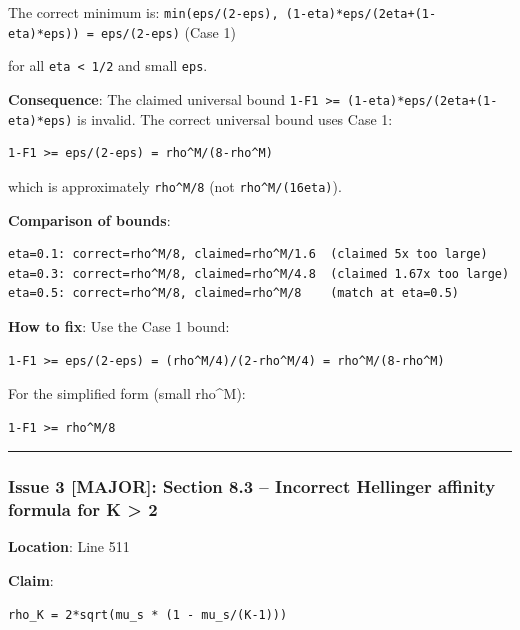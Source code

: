 \documentclass[
  12pt,
]{ctexart}
\begin{document}
The correct minimum is:
\texttt{min(eps/(2-eps),\ (1-eta)*eps/(2eta+(1-eta)*eps))\ =\ eps/(2-eps)}
(Case 1)

for all \texttt{eta\ \textless{}\ 1/2} and small \texttt{eps}.

\textbf{Consequence}: The claimed universal bound
\texttt{1-F1\ \textgreater{}=\ (1-eta)*eps/(2eta+(1-eta)*eps)} is
invalid. The correct universal bound uses Case 1:

\begin{verbatim}
1-F1 >= eps/(2-eps) = rho^M/(8-rho^M)
\end{verbatim}

which is approximately \texttt{rho\^{}M/8} (not
\texttt{rho\^{}M/(16eta)}).

\textbf{Comparison of bounds}:

\begin{verbatim}
eta=0.1: correct=rho^M/8, claimed=rho^M/1.6  (claimed 5x too large)
eta=0.3: correct=rho^M/8, claimed=rho^M/4.8  (claimed 1.67x too large)
eta=0.5: correct=rho^M/8, claimed=rho^M/8    (match at eta=0.5)
\end{verbatim}

\textbf{How to fix}: Use the Case 1 bound:

\begin{verbatim}
1-F1 >= eps/(2-eps) = (rho^M/4)/(2-rho^M/4) = rho^M/(8-rho^M)
\end{verbatim}

For the simplified form (small rho\^{}M):

\begin{verbatim}
1-F1 >= rho^M/8
\end{verbatim}

\begin{center}\rule{0.5\linewidth}{0.5pt}\end{center}

\subsubsection{Issue 3 {[}MAJOR{]}: Section 8.3 -- Incorrect Hellinger
affinity formula for K \textgreater{}
2}\label{issue-3-major-section-8.3-incorrect-hellinger-affinity-formula-for-k-2}

\textbf{Location}: Line 511

\textbf{Claim}:

\begin{verbatim}
rho_K = 2*sqrt(mu_s * (1 - mu_s/(K-1)))
\end{verbatim}
\end{document}
